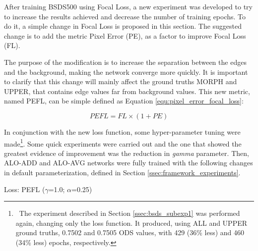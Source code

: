 After training BSDS500 using Focal Loss, a new experiment was developed to try to increase the results achieved and decrease the number of training epochs.
To do it, a simple change in Focal Loss is proposed in this section.
The suggested change is to add the metric Pixel Error (PE), as a factor to improve Focal Loss (FL).

The purpose of the modification is to increase the separation between the edges and the background, making the network converge more quickly.
It is important to clarify that this change will mainly affect the ground truths MORPH and UPPER, that contains edge values far from background values.
This new metric, named PEFL, can be simple defined as Equation \ref{equ:pixel_error_focal_loss}:

\begin{equation}
  PEFL = FL \times (1 + PE)
  \label{equ:pixel_error_focal_loss}
\end{equation}

In conjunction with the new loss function, some hyper-parameter tuning were made\footnote{~The experiment described in Section \ref{ssec:bsds_subexp1} was performed again, changing only the loss function. It produced, using ALL and UPPER ground truths, 0.7502 and 0.7505 ODS values, with 429 (36\% less) and 460 (34\% less) epochs, respectively.}.
Some quick experiments were carried out and the one that showed the greatest evidence of improvement was the reduction in \textit{gamma} parameter.
Then, ALO-ADD and ALO-AVG networks were fully trained with the following changes in default parameterization, defined in Section \ref{ssec:framework_experiments}.

\begin{center}
Loss: PEFL ($\gamma$=1.0; $\alpha$=0.25)
\end{center}

% 


